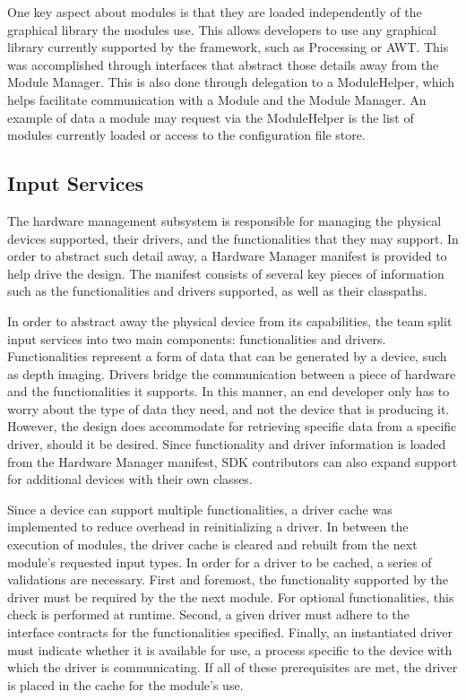 \documentclass[11pt,letterpaper]{article}
\begin{document}
	One key aspect about modules is that they are loaded independently of the 
	graphical library the modules use. This allows developers to use any 
	graphical library currently supported by the framework, such as Processing 
	or AWT.  This was accomplished through interfaces that abstract those 
	details away from the Module Manager.  This is also done through 
	delegation to a ModuleHelper, which helps facilitate communication with a 
	Module and the Module Manager. An example of data a module may request via 
	the ModuleHelper is the list of modules currently loaded or access to the 
	configuration file store.

	\subsection{Input Services}

	The hardware management subsystem is responsible for managing the physical 
	devices supported, their drivers, and the functionalities that they may 
	support. In order to abstract such detail away, a Hardware Manager 
	manifest is provided to help drive the design. The manifest consists of 
	several key pieces of information such as the functionalities and drivers 
	supported, as well as their classpaths.

	In order to abstract away the physical device from its capabilities, the 
	team split input services into two main components: functionalities and 
	drivers. Functionalities represent a form of data that can be generated by 
	a device, such as depth imaging. Drivers bridge the communication between 
	a piece of hardware and the functionalities it supports. In this manner, 
	an end developer only has to worry about the type of data they need, and 
	not the device that is producing it. However, the design does accommodate 
	for retrieving specific data from a specific driver, should it be desired. 
	Since functionality and driver information is loaded from the Hardware 
	Manager manifest, SDK contributors can also expand support for additional 
	devices with their own classes.

	Since a device can support multiple functionalities, a driver cache was 
	implemented to reduce overhead in reinitializing a driver. In between the 
	execution of modules, the driver cache is cleared and rebuilt from the 
	next module's requested input types. In order for a driver to be cached, a 
	series of validations are necessary. First and foremost, the functionality 
	supported by the driver must be required by the the next module. For 
	optional functionalities, this check is performed at runtime. Second, a 
	given driver must adhere to the interface contracts for the 
	functionalities specified. Finally, an instantiated driver must indicate 
	whether it is available for use, a process specific to the device with 
	which the driver is communicating. If all of these prerequisites are met, 
	the driver is placed in the cache for the module's use. 
\end{document}
